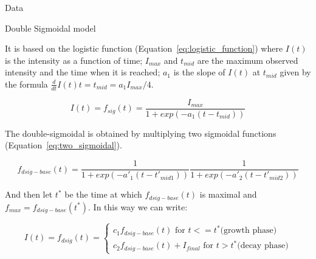 \documentclass[20pt]{beamer}
\begin{document}
\begin{frame}[fragile,t]
\begin{columns}[t]
\begin{column}{0.33\linewidth}
\begin{block}{Data\vphantom{g}}
    \end{block}

    \vspace{0.5cm}

    \begin{block}{Double Sigmoidal model\vphantom{g}}

\vspace{1.0cm}

It is based on the logistic function (Equation~\ref{eq:logistic_function}) where $I(t)$ is the intensity as a function of time; $I_{max}$ and $t_{mid}$ are the maximum observed intensity and the time when it is reached; $a_{1}$ is the slope of $I(t)$ at $t_{mid}$ given by the formula $\frac{d}{dt} I(t)t = t_{mid} = a_{1}I_{max}/4$.

\begin{equation}
    I(t) = f_{sig}(t) = \frac{I_{max}}{ 1 + exp(-a_{1}(t - t_{mid}))}
    \label{eq:logistic_function}
\end{equation}

    \vspace{0.5cm}

The double-sigmoidal is obtained by multiplying two sigmoidal functions (Equation~\ref{eq:two_sigmoidal}).

\begin{equation}
    {
        \scriptstyle{
            f_{dsig-base}(t) = \frac{1}{1 + exp(-a'_{1}(t -t'_{mid1}))}
            \frac{1}{1 + exp(-a'_{2}(t -t'_{mid2}))}
        }
        \label{eq:two_sigmoidal}
    }
\end{equation}

    \vspace{0.5cm}

And then let $t^*$ be the time at which $f_{dsig-base}(t)$ is maximal and $f_{max} = f_{dsig-base}(t^*)$.
In this way we can write:

\begin{equation*}
    {
        \scriptstyle{
            I(t) = f_{dsig}(t) = 
            \left\{
                \begin{array}{rl}
                    c_{1}  f_{dsig-base}(t) \text{ for } t <= t^* \text{(growth phase)} \\
                    c_{2}  f_{dsig-base}(t) + I_{final} \text{ for } t > t^* \text{(decay phase)}
                \end{array}
            \right.
        }
        }
\end{equation*}

    \vspace{0.5cm}


\end{block}
\end{column}
\end{columns}
\end{frame}
\end{document}
